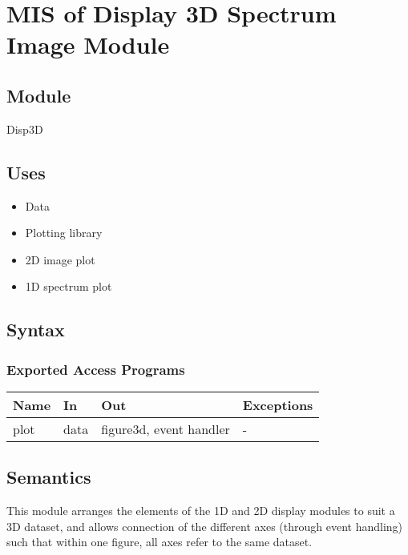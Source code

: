 \documentclass[12pt, titlepage]{article}
\begin{document}
\section{MIS of Display 3D Spectrum Image Module} \label{Mod:Disp3D}

\subsection{Module}

Disp3D

\subsection{Uses}
\begin{itemize}
    \item Data
    \item Plotting library
    \item 2D image plot
    \item 1D spectrum plot
\end{itemize}

\subsection{Syntax}

\subsubsection{Exported Access Programs}

\begin{center}
    \begin{tabular}{p{2cm} p{3cm} p{5cm} p{2cm}}
        \hline
        \textbf{Name} & \textbf{In} & \textbf{Out} & \textbf{Exceptions} \\
        \hline
        plot & data & figure3d, event handler & - \\
        \hline
    \end{tabular}
\end{center}

\subsection{Semantics}
This module arranges the elements of the 1D and 2D display modules to suit a 3D
dataset, and allows connection of the different axes (through event handling)
such that within one figure, all axes refer to the same dataset.
\end{document}
